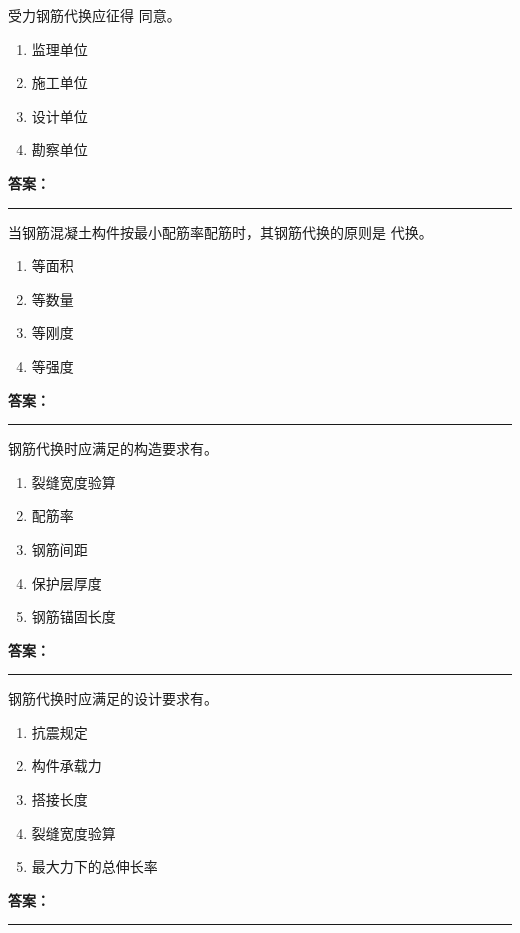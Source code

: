 \documentclass[UTF8,fontset=fandol,11pt]{ctexart}
\newcommand{\answerline}{\textcolor{answerred}{\rule{2.4cm}{0.7pt}}}
\begin{document}
\begin{quizbox}[title={第 13 题}]
受力钢筋代换应征得 同意。\\
\begin{enumerate}[label=\Alph*.]
\item 监理单位
\item 施工单位
\item 设计单位
\item 勘察单位
\end{enumerate}
\textbf{\textcolor{answerred}{答案：}} \answerline
\end{quizbox}

\begin{quizbox}[title={第 14 题}]
当钢筋混凝土构件按最小配筋率配筋时，其钢筋代换的原则是 代换。\\
\begin{enumerate}[label=\Alph*.]
\item 等面积
\item 等数量
\item 等刚度
\item 等强度
\end{enumerate}
\textbf{\textcolor{answerred}{答案：}} \answerline
\end{quizbox}

\begin{quizbox}[title={第 15 题}]
钢筋代换时应满足的构造要求有。\\
\begin{enumerate}[label=\Alph*.]
\item 裂缝宽度验算
\item 配筋率
\item 钢筋间距
\item 保护层厚度
\item 钢筋锚固长度
\end{enumerate}
\textbf{\textcolor{answerred}{答案：}} \answerline
\end{quizbox}

\begin{quizbox}[title={第 16 题}]
钢筋代换时应满足的设计要求有。\\
\begin{enumerate}[label=\Alph*.]
\item 抗震规定
\item 构件承载力
\item 搭接长度
\item 裂缝宽度验算
\item 最大力下的总伸长率
\end{enumerate}
\textbf{\textcolor{answerred}{答案：}} \answerline
\end{quizbox}
\end{document}
